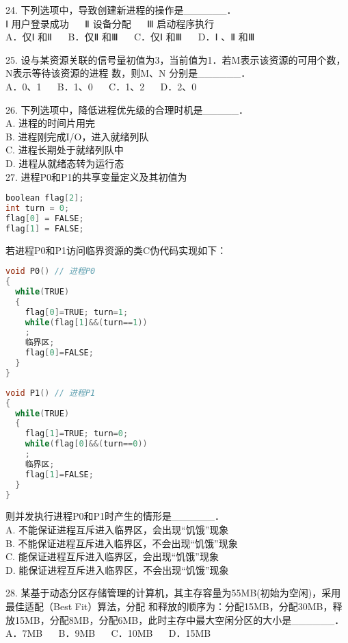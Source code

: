 24. 下列选项中，导致创建新进程的操作是______． \\
Ⅰ 用户登录成功 $\quad$ Ⅱ 设备分配 $\quad$ Ⅲ 启动程序执行 \\
A．仅Ⅰ 和Ⅱ $\quad$ B．仅Ⅱ 和Ⅲ $\quad$ C．仅Ⅰ 和Ⅲ $\quad$ D．Ⅰ 、Ⅱ 和Ⅲ

25. 设与某资源关联的信号量初值为3，当前值为1．若M表示该资源的可用个数，N表示等待该资源的进程
数，则M、N 分别是______． \\
A．0、1 $\quad$ B．1、0 $\quad$ C．1、2 $\quad$ D．2、0

26. 下列选项中，降低进程优先级的合理时机是_____． \\
A. 进程的时间片用完 \\
B. 进程刚完成I/O，进入就绪列队 \\
C. 进程长期处于就绪列队中 \\
D. 进程从就绪态转为运行态 \\

27. 进程P0和P1的共享变量定义及其初值为 \\
\begin{lstlisting}[language=cpp]
boolean flag[2];
int turn = 0;
flag[0] = FALSE;
flag[1] = FALSE;
\end{lstlisting}
若进程P0和P1访问临界资源的类C伪代码实现如下：
\begin{lstlisting}[language=cpp]
void P0() // 进程P0
{
  while(TRUE)
  {
    flag[0]=TRUE; turn=1;
    while(flag[1]&&(turn==1))
    ;
    临界区;
    flag[0]=FALSE;
  }
}
\end{lstlisting}

\begin{lstlisting}[language=cpp]
void P1() // 进程P1
{
  while(TRUE)
  {
    flag[1]=TRUE; turn=0;
    while(flag[0]&&(turn==0))
    ;
    临界区;
    flag[1]=FALSE;
  }
}
\end{lstlisting}
则并发执行进程P0和P1时产生的情形是______．  \\
A. 不能保证进程互斥进入临界区，会出现“饥饿”现象 \\
B. 不能保证进程互斥进入临界区，不会出现“饥饿”现象 \\
C. 能保证进程互斥进入临界区，会出现“饥饿”现象 \\
D. 能保证进程互斥进入临界区，不会出现“饥饿”现象

28. 某基于动态分区存储管理的计算机，其主存容量为55MB(初始为空闲)，采用最佳适配（Best Fit）算法，分配
和释放的顺序为：分配15MB，分配30MB，释放15MB，分配8MB，分配6MB，此时主存中最大空闲分区的大小是______． \\
A．7MB $\quad$ B．9MB $\quad$ C．10MB $\quad$ D．15MB

